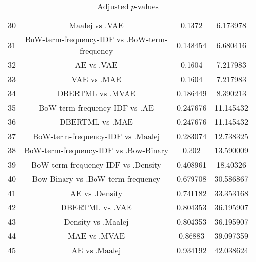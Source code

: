 \documentclass[a4paper,10pt]{article}
\begin{document}
\begin{landscape}
\begin{table}[!htp]
\begin{tabular}{cccc}
30&Maalej vs .VAE&0.1372&6.173978\\
31&BoW-term-frequency-IDF vs .BoW-term-frequency&0.148454&6.680416\\
32&AE vs .VAE&0.1604&7.217983\\
33&VAE vs .MAE&0.1604&7.217983\\
34&DBERTML vs .MVAE&0.186449&8.390213\\
35&BoW-term-frequency-IDF vs .AE&0.247676&11.145432\\
36&DBERTML vs .MAE&0.247676&11.145432\\
37&BoW-term-frequency-IDF vs .Maalej&0.283074&12.738325\\
38&BoW-term-frequency-IDF vs .Bow-Binary&0.302&13.590009\\
39&BoW-term-frequency-IDF vs .Density&0.408961&18.40326\\
40&Bow-Binary vs .BoW-term-frequency&0.679708&30.586867\\
41&AE vs .Density&0.741182&33.353168\\
42&DBERTML vs .VAE&0.804353&36.195907\\
43&Density vs .Maalej&0.804353&36.195907\\
44&MAE vs .MVAE&0.86883&39.097359\\
45&AE vs .Maalej&0.934192&42.038624\\
\hline
\end{tabular}
\caption{Adjusted $p$-values}
\end{table}

\end{landscape}
\end{document}
